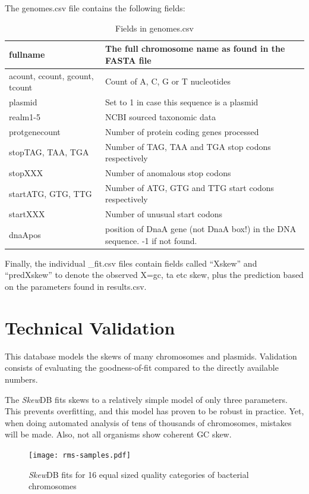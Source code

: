 \documentclass[fleqn,10pt]{wlscirep}
\begin{document}
The genomes.csv file contains the following fields:

\begin{table}[H]
\begin{tabular}{|l|l|}
  \hline
fullname                 & The full chromosome name as found in the FASTA file                \\ \hline
acount, ccount, gcount, tcount                 & Count of A, C, G or T nucleotides                \\ \hline
plasmid & Set to 1 in case this sequence is a plasmid \\ \hline
realm1-5     & NCBI sourced taxonomic data \\ \hline
protgenecount                           & Number of protein coding genes processed          \\ \hline
stopTAG, TAA, TGA & Number of TAG, TAA and TGA stop codons respectively          \\ \hline
stopXXX & Number of anomalous stop codons  \\ \hline
startATG, GTG, TTG & Number of ATG, GTG and TTG start codons respectively          \\ \hline
startXXX & Number of unusual start codons  \\ \hline
dnaApos & position of DnaA gene (not DnaA box!) in the DNA sequence. -1 if not found.  \\ \hline
\end{tabular}
\caption{Fields in genomes.csv}
\label{tab:genomes-table}
\end{table}


Finally, the individual \_fit.csv files contain fields called ``Xskew'' and ``predXskew'' to denote the observed X=gc, ta etc skew, plus the prediction based on the parameters found in results.csv. 
\section*{Technical Validation}
This database models the skews of many chromosomes and plasmids. Validation consists of evaluating the goodness-of-fit compared to the directly available numbers.

The \emph{Skew}DB fits skews to a relatively simple model of only three parameters. This prevents overfitting, and this model has proven to be robust in practice. Yet, when doing automated analysis of tens of thousands of chromosomes, mistakes will be made. Also, not all organisms show coherent GC skew.

\begin{figure}[tbhp]
\centering
\texttt{[image: rms-samples.pdf]}
\caption{\emph{Skew}DB fits for 16 equal sized quality categories of bacterial chromosomes}
\label{fig:rms-samples}
\end{figure}
\end{document}
